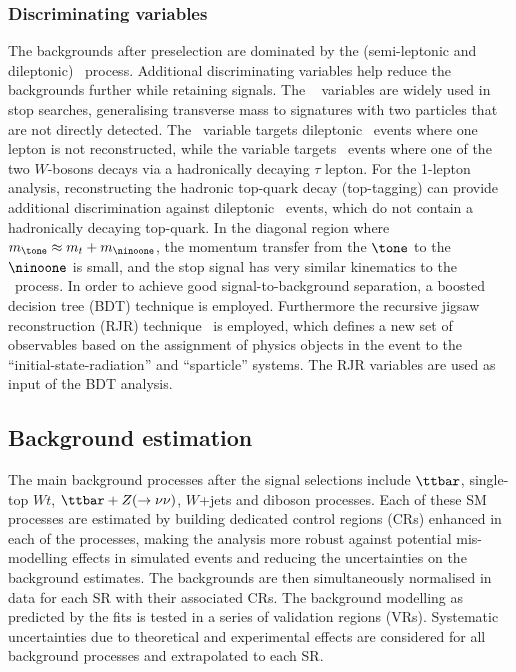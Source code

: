 \documentclass[UKenglish,10pt]{article}
\begin{document}
\subsubsection{Discriminating variables}

The backgrounds after preselection are dominated by the (semi-leptonic and dileptonic) \ttbar\ process. Additional discriminating variables help reduce the backgrounds further while retaining signals. The \mtTwo~\cite{Lester:1999tx} variables are widely used in stop searches, generalising transverse mass to signatures with two particles that are not directly detected. The \amtTwo\ variable targets dileptonic \ttbar\ events where one lepton is not reconstructed, while the \mtTwoTau variable targets \ttbar\ events where one of the two $W$-bosons decays via a hadronically decaying $\tau$ lepton. For the 1-lepton analysis, reconstructing the hadronic top-quark decay (top-tagging) can provide additional discrimination against dileptonic \ttbar\ events, which do not contain a hadronically decaying top-quark. In the diagonal region where $m_{\tone} \approx m_t + m_{\ninoone}$, the momentum transfer from the $\tone$ to the $\ninoone$ is small, and the stop signal has very similar kinematics to the \ttbar\ process. In order to achieve good signal-to-background separation, a boosted decision tree (BDT) technique is employed. Furthermore the recursive jigsaw reconstruction (RJR) technique~\cite{Jackson:2016mfb} is employed, which defines a new set of observables based on the assignment of physics objects in the event to the ``initial-state-radiation'' and ``sparticle'' systems. The RJR variables are used as input of the BDT analysis.

\subsection{Background estimation}

The main background processes after the signal selections include $\ttbar$, single-top $Wt$, $\ttbar+Z(\rightarrow \nu\nu)$, $W$+jets and diboson processes. Each of these SM processes are estimated by building dedicated control regions (CRs) enhanced in each of the processes, making the analysis more robust against potential mis-modelling effects in simulated events and reducing the uncertainties on the background estimates. The backgrounds are then simultaneously normalised in data for each SR with their associated CRs. The background modelling as predicted by the fits is tested in a series of validation regions (VRs). Systematic uncertainties due to theoretical and experimental effects are considered for all background processes and extrapolated to each SR.
\end{document}
